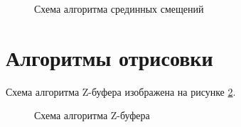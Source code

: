 \begin{figure}[ph!]
	\caption{Схема алгоритма срединных смещений}
	\label{fig:brown_mov_alg}
\end{figure}

\clearpage

\section{Алгоритмы отрисовки}

Схема алгоритма Z-буфера изображена на рисунке \ref{fig:z_buf_alg}.

\begin{figure}[ph!]
	\caption{Схема алгоритма Z-буфера}
	\label{fig:z_buf_alg}
\end{figure}

